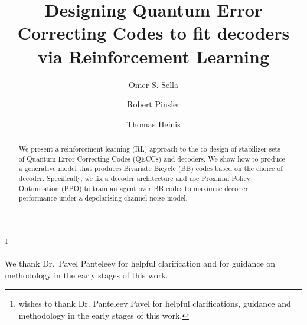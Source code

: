 \documentclass[a4paper,onecolumn,11pt, unpublished]{quantumarticle}
\begin{document}
\title{Designing Quantum Error Correcting Codes to fit decoders via Reinforcement Learning}

\author{Omer S. Sella}
\thanks{wishes to thank Dr. Panteleev Pavel for helpful clarifications, guidance and methodology in the early stages of this work.}
\author{Robert Pinsler}
\author{Thomas Heinis}


\maketitle
\begin{abstract}
We present a reinforcement learning (RL) approach to the co-design of stabilizer sets of Quantum Error Correcting Codes (QECCs) and decoders. 
We show how to produce a generative model that produces Bivariate Bicycle (BB) codes based on the choice of decoder.
Specifically, we fix a decoder architecture and use Proximal Policy Optimisation (PPO) to train an agent over BB codes to maximise decoder performance under a depolarising channel noise model. 
\end{abstract}





















\begin{acknowledgements}
We thank Dr.\ Pavel Panteleev for helpful clarification and for guidance on methodology
in the early stages of this work.
\end{acknowledgements}

\appendix

%

\end{document}
